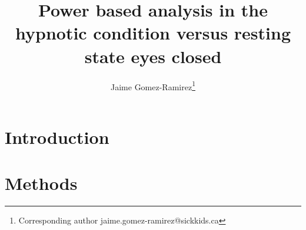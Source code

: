 \documentclass[11pt, onecolumn]{article}
\begin{document}
\title{Power based analysis in the hypnotic condition versus resting state eyes closed}

\author[1]{Jaime Gomez-Ramirez\thanks{Corresponding author \hspace{0.6cm} jaime.gomez-ramirez@sickkids.ca}}
\author[2]{}%
\affil[2]{}

\date{}
\maketitle

\begin{abstract}

\end{abstract}
\section{Introduction}
\label{se:intro}

\section{Methods}
\label{se:methods}
\end{document}
